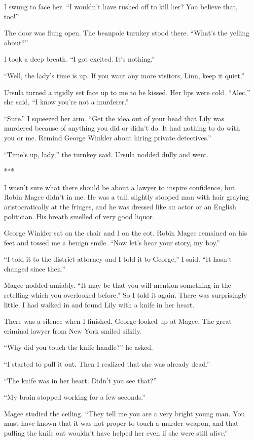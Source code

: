 {I swung to face her. “I wouldn’t have rushed off to kill her? You believe that, too!”

The door was flung open. The beanpole turnkey stood there. “What’s the yelling about?”

I took a deep breath. “I got excited. It’s nothing.”

“Well, the lady’s time is up. If you want any more visitors, Linn, keep it quiet.”

Ursula turned a rigidly set face up to me to be kissed. Her lips were cold. “Alec,” she said, “I know you’re not a murderer.”

“Sure.” I squeezed her arm. “Get the idea out of your head that Lily was murdered because of anything you did or didn’t do. It had nothing to do with you or me. Remind George Winkler about hiring private detectives.”

“Time’s up, lady,” the turnkey said. Ursula nodded dully and went.

***

I wasn’t sure what there should be about a lawyer to inspire confidence, but Robin Magee didn’t in me. He was a tall, slightly stooped man with hair graying aristocratically at the fringes, and he was dressed like an actor or an English politician. His breath smelled of very good liquor.

George Winkler sat on the chair and I on the cot. Robin Magee remained on his feet and tossed me a benign smile. “Now let’s hear your story, my boy.”

“I told it to the district attorney and I told it to George,” I said. “It hasn’t changed since then.”

Magee nodded amiably. “It may be that you will mention something in the retelling which you overlooked before.” So I told it again. There was surprisingly little. I had walked in and found Lily with a knife in her heart.

There was a silence when I finished. George looked up at Magee. The great criminal lawyer from New York smiled silkily.

“Why did you touch the knife handle?” he asked.

“I started to pull it out. Then I realized that she was already dead.”

“The knife was in her heart. Didn’t you see that?”

“My brain stopped working for a few seconds.”

Magee studied the ceiling. “They tell me you are a very bright young man. You must have known that it was not proper to touch a murder weapon, and that pulling the knife out wouldn’t have helped her even if she were still alive.”

}
